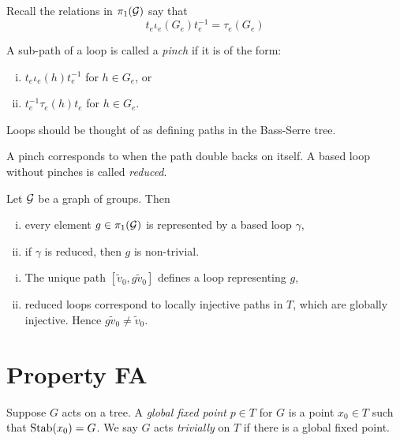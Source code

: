 \documentclass{article}
\begin{document}
Recall the relations in \(\pi_1(\mathcal{G})\) say that
\[t_e\iota_e(G_e)t_e^{-1} = \tau_e(G_e)\]

\begin{definition}
    [pinch]
    A sub-path of a loop is called a \emph{pinch} if it is of the form:
    \begin{enumerate}[(i)]
        \item \(t_e\iota_e(h)t_e^{-1}\) for \(h \in G_e\), or
        \item \(t_e^{-1}\tau_e(h)t_e\) for \(h \in G_e\).
    \end{enumerate}
\end{definition}

\begin{remark}
    Loops should be thought of as defining paths in the Bass-Serre tree.
\end{remark}

A pinch corresponds to when the path double backs on itself. A based loop without pinches is called \emph{reduced}.

\begin{theorem}
     Let \(\mathcal{G}\) be a graph of groups. Then
    \begin{enumerate}[(i)]
        \item every element \(g \in \pi_1(\mathcal{G})\) is represented by a based loop \(\gamma\),
        \item if \(\gamma\) is reduced, then \(g\) is non-trivial.
    \end{enumerate}
\end{theorem}

\begin{remark}
    \begin{enumerate}[(i)]
        \item The unique path \([\widetilde v_0, g\widetilde v_0]\) defines a loop representing \(g\),
        \item reduced loops correspond to locally injective paths in \(T\), which are globally injective. Hence \(g\widetilde v_0  \ne \widetilde v_0\). 
    \end{enumerate}
\end{remark}

\section{Property FA}

Suppose \(G\) acts on a tree. A \emph{global fixed point} \(p \in T\) for \(G\) is a point \(x_0 \in T\) such that \(\operatorname{Stab}(x_0) = G\). We say \(G\) acts \emph{trivially} on \(T\) if there is a global fixed point.
\end{document}
